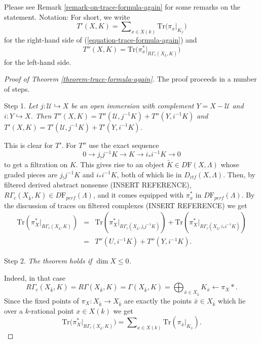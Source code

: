 \noindent
Please see Remark \ref{remark-on-trace-formula-again} for some remarks
on the statement. Notation: For short, we write
$$
T'(X, K) =
\sum\nolimits_{x\in X(k)}
\text{Tr}\big(\pi_x\big|_{K_{\bar x}}\big)
$$
for the right-hand side of (\ref{equation-trace-formula-again}) and
$$
T''(X, K)
=\text{Tr}\big(\pi_x^*\big|_{R\Gamma_c(X_{\bar k}, K)}\big)
$$
for the left-hand side.

\begin{proof}[Proof of Theorem \ref{theorem-trace-formula-again}]
The proof proceeds in a number of steps.

\medskip\noindent
Step 1. {\it Let $j: \mathcal{U}\hookrightarrow X$ be an open immersion with
complement $Y = X - \mathcal{U}$ and $i: Y \hookrightarrow X$. Then
$T''(X, K) = T''(\mathcal{U}, j^{-1} K)+ T''(Y, i^{-1}K)$ and
$T'(X, K) = T'(\mathcal{U}, j^{-1} K)+ T'(Y, i^{-1}K)$.}

\medskip\noindent
This is clear for $T'$. For $T''$ use the exact sequence
$$
0\to j_!j^{-1} K \to K \to i_* i^{-1} K \to 0
$$
to get a filtration on $K$. This gives rise to an object
$\widetilde K \in D\mathrm{F}(X, \Lambda)$
whose graded pieces are $j_!j^{-1}K$ and $i_*i^{-1}K$,
both of which lie in $D_{ctf}(X, \Lambda)$. Then, by filtered derived
abstract nonsense (INSERT REFERENCE),
$R\Gamma_c(X_{\bar k}, K)\in D\mathrm{F}_{perf}(\Lambda)$,
and it comes equipped with $\pi_x^*$ in
$D\mathrm{F}_{perf}(\Lambda)$.
By the discussion of traces on filtered complexes (INSERT REFERENCE) we get
\begin{eqnarray*}
\text{Tr}\left(\pi_X^*\big|_{R\Gamma_c(X_{\bar k}, K)}\right)
& = & \text{Tr}\left(\pi_X^*\big|_{R\Gamma_c(X_{\bar k}, j_!j^{-1}K)}\right)+
\text{Tr}\left(\pi_X^*\big|_{R\Gamma_c(X_{\bar k}, i_*i^{-1}K)}\right)
\\
& = & T''(U, i^{-1}K) + T''(Y, i^{-1}K).
\end{eqnarray*}

\medskip\noindent
Step 2. {\it The theorem holds if $\dim X\leq 0$. }

\medskip\noindent
Indeed, in that case
$$
R\Gamma_c(X_{\bar k}, K) = R\Gamma(X_{\bar k}, K) = \Gamma(X_{\bar k}, K) =
\bigoplus\nolimits_{\bar x\in X_{\bar k}} K_{\bar x} \leftarrow \pi_X*.
$$
Since the fixed points of $\pi_X: X_{\bar k}\to X_{\bar k}$ are exactly the
points $\bar x\in X_{\bar k}$ which lie over a $k$-rational point $x\in X(k)$
we get
$$
\text{Tr}\big(\pi_X^*|_{R\Gamma_c(X_{\bar k}, K)}\big) =
\sum\nolimits_{x\in X(k)}\text{Tr}(\pi_{\bar x}|_{K_{\bar x}}).
$$


\end{proof}
